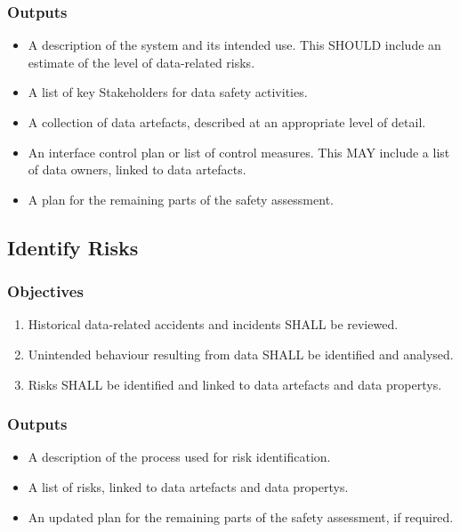 \subsubsection{Outputs}
\begin{itemize}
	\item A description of the system and its intended use. This SHOULD include an estimate of the level of data-related risks.
	\item A list of key Stakeholders for data safety activities.
	\item A collection of \glspl{data artefact}, described at an appropriate level of detail.
	\item An interface control plan or list of control measures. This MAY include a list of \glspl{data owner}, linked to \glspl{data artefact}.
	\item A plan for the remaining parts of the \gls{safety assessment}.
\end{itemize}

\subsection{Identify Risks}
\subsubsection{Objectives}
\begin{enumerate}[label=\color{dsiwgAccentColour}{2-\arabic*}]
	\item Historical data-related accidents and incidents SHALL be reviewed.
	\item Unintended behaviour resulting from data SHALL be identified and analysed.
	\item Risks SHALL be identified and linked to \glspl{data artefact} and \glspl{data property}.
\end{enumerate}

\subsubsection{Outputs}
\begin{itemize}
	\item A description of the process used for risk identification.
	\item A list of risks, linked to \glspl{data artefact} and \glspl{data property}.
	\item An updated plan for the remaining parts of the \gls{safety assessment}, if required.
\end{itemize}

